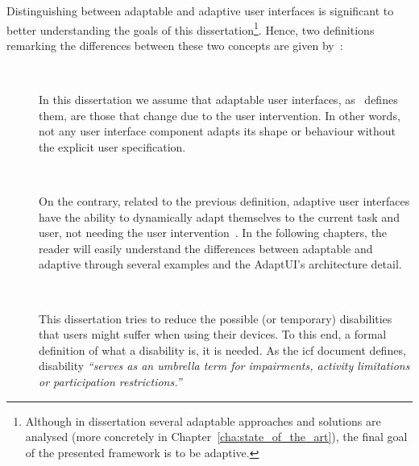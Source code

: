 \begin{description}
  Distinguishing between adaptable and adaptive user interfaces is significant
  to better understanding the goals of this dissertation\footnote{Although in
  dissertation several adaptable approaches and solutions are analysed (more
  concretely in Chapter~\ref{cha:state_of_the_art}), the final goal of the 
  presented framework is to be adaptive.}. Hence, two definitions remarking the 
  differences between these two concepts are given by~\citeauthor{fischer_user_2001}:
 
\end{description}


\newpage

  
\begin{description}
  \item[] \hfill \\
  \begin{mdframed}[hidealllines=true,backgroundcolor=gray!20]
  In this dissertation we assume that adaptable user interfaces,
  as~\citet{fischer_user_2001} defines them, are those that change due to the 
  user intervention. In other words, not any user interface component adapts its
  shape or behaviour without the explicit user specification.
  \end{mdframed}

  \item[] \hfill \\
  \begin{mdframed}[hidealllines=true,backgroundcolor=gray!20]
  On the contrary, related to the previous definition, adaptive user interfaces
  have the ability to dynamically adapt themselves to the current task and user,
  not needing the user intervention~\citep{fischer_user_2001}. In the following
  chapters, the reader will easily understand the differences between adaptable 
  and adaptive through several examples and the AdaptUI's architecture detail.
  \end{mdframed}

  \item[] \hfill \\
  \begin{mdframed}[hidealllines=true,backgroundcolor=gray!20]
  This dissertation tries to reduce the possible (or temporary) disabilities 
  that users might suffer when using their devices. To this end, a formal 
  definition of what a disability is, it is needed. As the \ac{icf} document defines, 
  disability \textit{``serves as an umbrella term for impairments, activity 
  limitations or participation restrictions.''}
  \end{mdframed}


\end{description}
